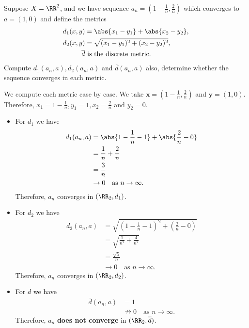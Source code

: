 \documentclass[12pt, a4paper]{article}
\begin{document}
\begin{mdexample}
    Suppose \(X = \RR^2\), and we have sequence \(a_n =(1-\frac{1}{n},\frac{2}{n})\) which converges to \(a = (1,0)\) and define the metrics
    \[\begin{aligned}
        d_1(x,y) &= \abs{x_1-y_1}+\abs{x_2-y_2}, \\
        d_2(x,y) &= \sqrt{(x_1-y_1)^2+(x_2-y_2)^2}, \\
        \overline{d} &\text{ is the discrete metric}.
    \end{aligned}\]
    Compute \(d_1(a_n,a) , d_2(a_n,a)\) and \(\overline{d}(a_n,a)\) also, determine whether the sequence converges in each metric.
    \begin{solution}
        We compute each metric case by case. We take \(\bm{x} = (1-\frac{1}{n},\frac{2}{n})\) and \(\bm{y}=(1,0)\). Therefore, \(x_1 = 1- \frac{1}{n}, y_1 = 1, x_2 = \frac{2}{n}\) and \(y_2= 0\).
        \begin{itemize}
            \item For \(d_1\) we have
            \[\begin{aligned}
                d_1(a_n,a) &= \abs{1-\frac{1}{n} - 1} + \abs{\frac{2}{n} - 0} \\
                &= \frac{1}{n} + \frac{2}{n} \\
                &= \frac{3}{n} \\
                &\to 0 \quad \text{as } n\to \infty.
            \end{aligned}\]
            Therefore, \(a_n\) converges in \((\RR_2,d_1)\).
            \item For \(d_2\) we have 
            \[\begin{aligned}
                d_2(a_n,a) &= \sqrt{\left( 1-\frac{1}{n} - 1 \right)^2 + \left( \frac{2}{n} - 0 \right)} \\
                &= \sqrt{\frac{1}{n^2} + \frac{4}{n^2}} \\
                &= \frac{\sqrt{5}}{n} \\
                &\to 0 \quad \text{as } n\to \infty.
            \end{aligned}\]
            Therefore, \(a_n\) converges in \((\RR_2,d_2)\).
            \item For \(\overline{d}\) we have 
            \[\begin{aligned}
                \overline{d}(a_n,a) &= 1 \\
                &\nrightarrow 0 \quad \text{as } n\to \infty.
            \end{aligned}\]
            Therefore, \(a_n\) \textbf{does not converge} in \((\RR_2,\overline{d})\).
        \end{itemize}
    \end{solution}
\end{mdexample}
\end{document}
